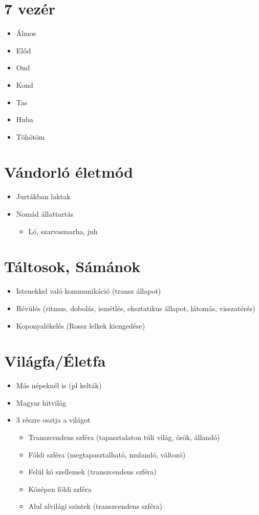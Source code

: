 \documentclass{article}
\begin{document}
\section{7 vezér}
\begin{itemize}
    \item Álmos
    \item Előd
    \item Ond
    \item Kond
    \item Tas
    \item Huba
    \item Töhötöm
\end{itemize}

\section{Vándorló életmód}
\begin{itemize}
    \item Jurtákban laktak
    \item Nomád állattartás \begin{itemize}
        \item Ló, szarvasmarha, juh
    \end{itemize}
\end{itemize}

\section{Táltosok, Sámánok}
\begin{itemize}
    \item Istenekkel való kommunikáció (transz állapot)
    \item Révülés (ritmus, dobolás, ismétlés, eksztatikus állapot, látomás, visszatérés)
    \item Koponyalékelés (Rossz lelkek kiengedése)
\end{itemize}

\section{Világfa/Életfa}
\begin{itemize}
    \item Más népeknél is (pl kelták)
    \item Magyar hitvilág
    \item 3 részre osztja a világot \begin{itemize}
        \item Transzcendens szféra (tapasztalaton túli világ, örök, állandó)
        \item Földi szféra (megtapasztalható, mulandó, változó)
        \end{itemize}
        
        \begin{itemize}
        \item Felül kó szellemek (transzcendens szféra)
        \item Középen földi szféra
        \item Alul alvilági szintek (transzcendens szféra)
        \end{itemize}
\end{itemize}
\end{document}
